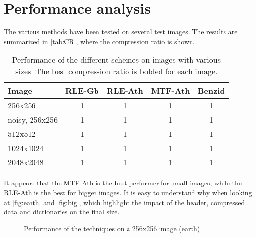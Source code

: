 \section{Performance analysis}

The various methods have been tested on several test images. The results are summarized in \autoref{tab:CR}, where the compression ratio is shown.

\begin{table}[h]
	\centering
	\begin{tabular}{|l|cccc|}
		\hline
		Image                 &RLE-Gb & RLE-Ath & MTF-Ath & Benzid \\ \hline
		256x256      & 1                           & 1                            & 1                            & 1      \\
		noisy, 256x256 & 1                           & 1                            & 1                            & 1      \\
		512x512      & 1                           & 1                            & 1                            & 1      \\
		1024x1024   & 1                           & 1                            & 1                            & 1      \\
		2048x2048 & 1                           & 1                            & 1                            & 1      \\ \hline
	\end{tabular}
	\caption{Performance of the different schemes on images with various sizes. The best compression ratio is bolded for each image.}
	\label{tab:CR}
\end{table}

It appears that the MTF-Ath is the best performer for small images, while the RLE-Ath is the best for bigger images. It is easy to understand why when looking at \autoref{fig:earth} and \autoref{fig:big}, which highlight the impact of the header, compressed data and dictionaries on the final size.

\begin{figure}[h]
	\centering
	\caption{Performance of the techniques on a 256x256 image (earth)}
	\label{fig:earth}
\end{figure}

